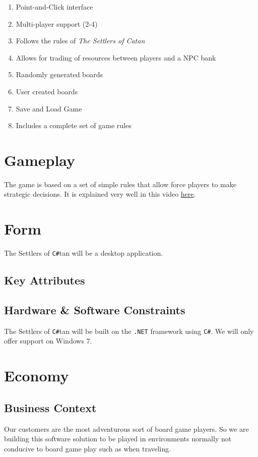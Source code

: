 \documentclass[12pt]{article}
\begin{document}
\begin{enumerate}

\item Point-and-Click interface
\item Multi-player support (2-4)
\item Follows the rules of \emph{The Settlers of Catan}
\item Allows for trading of resources between players and a NPC bank
\item Randomly generated boards
\item User created boards
\item Save and Load Game
\item Includes a complete set of game rules

\end{enumerate}

\section{Gameplay}
The game is based on a set of simple rules that allow force players to make strategic decisions. It is explained very well in this video \href{http://www.youtube.com/watch?v=FURoYf5IXRA&feature=player_embedded#!}{here}.

\section{Form}
The Settlers of \verb!C#!tan will be a desktop application.

\subsection{Key Attributes}

\subsection{Hardware \& Software Constraints}
 The Settlers of \verb!C#!tan will be built on the \verb!.NET! framework using \verb!C#!. We will only offer support on Windows 7.

\section{Economy}

\subsection{Business Context}
Our customers are the most adventurous sort of board game players. So we are building this software solution to be played in environments normally not conducive to board game play such as when traveling. 
\end{document}
